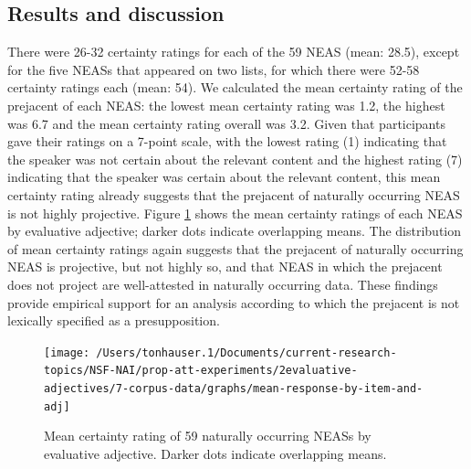 \documentclass[11pt,fleqn]{article}
\newcommand{\6}{\mbox{$[\hspace*{-.6mm}[$}}
\newcommand{\9}{\mbox{$]\hspace*{-.6mm}]$}}
\begin{document}
\subsection{Results and discussion}

There were 26-32 certainty ratings for each of the 59 NEAS (mean: 28.5), except for the five NEASs that appeared on two lists, for which there were 52-58 certainty ratings each (mean: 54). We calculated the mean certainty rating of the prejacent of each NEAS: the lowest mean certainty rating was 1.2, the highest was 6.7 and the mean certainty rating overall was 3.2. Given that participants gave their ratings on a 7-point scale, with the lowest rating (1) indicating that the speaker was not certain about the relevant content and the highest rating (7) indicating that the speaker was certain about the relevant content, this mean certainty rating already suggests that the prejacent of naturally occurring NEAS is not highly projective. Figure \ref{f-corpus} shows the mean certainty ratings of each NEAS by evaluative adjective; darker dots indicate overlapping means. The distribution of mean certainty ratings again suggests that the prejacent of naturally occurring NEAS is projective, but not highly so, and that NEAS in which the prejacent does not project are well-attested in naturally occurring data. These findings provide empirical support for an analysis according to which the prejacent is not lexically specified as a presupposition.

\begin{figure}[h!]
\centering

\texttt{[image: /Users/tonhauser.1/Documents/current-research-topics/NSF-NAI/prop-att-experiments/2evaluative-adjectives/7-corpus-data/graphs/mean-response-by-item-and-adj]}

\caption{Mean certainty rating of 59 naturally occurring NEASs by evaluative adjective. Darker dots indicate overlapping means.}\label{f-corpus}

\end{figure}
\end{document}
